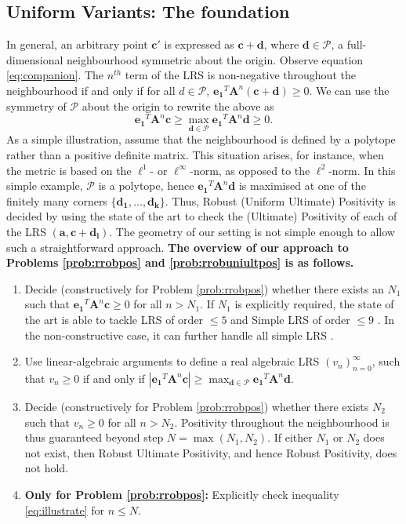 \subsection{Uniform Variants: The foundation}
\label{section:uniformfoundation}
In general, an arbitrary point $\mathbf{c'}$ is expressed as $\mathbf{c} + \mathbf{d}$, where $\mathbf{d} \in \mathcal{P}$, a full-dimensional neighbourhood symmetric about the origin. Observe equation \ref{eq:companion}. The $n^{th}$ term of the LRS is non-negative throughout the neighbourhood if and only if for all $d \in \mathcal{P}$,
$
\mathbf{e_1}^T \mathbf{A}^n (\mathbf{c + d}) \ge 0.
$
We can use the symmetry of $\mathcal{P}$ about the origin to rewrite the above as
\begin{equation}
\label{eq:illustrate}
\mathbf{e_1}^T \mathbf{A}^n \mathbf{c}\ge \max_{\mathbf{d} \in \mathcal{P}} \mathbf{e_1}^T\mathbf{A}^n\mathbf{d} \ge 0.
\end{equation}
As a simple illustration, assume that the neighbourhood is defined by a polytope rather than a positive definite matrix. This situation arises, for instance, when the metric is based on the $\ell^1$- or $\ell^\infty$-norm, as opposed to the $\ell^2$-norm.  In this simple example, $\mathcal{P}$ is a polytope, hence $\mathbf{e_1}^T\mathbf{A}^n\mathbf{d}$ is maximised at one of the finitely many corners $\{\mathbf{d_1}, \dots, \mathbf{d_k}\}$. Thus, Robust (Uniform Ultimate) Positivity is decided by using the state of the art \cite{joeljames3} to check the (Ultimate) Positivity of each of the LRS $(\mathbf{a}, \mathbf{c+d_i})$. The geometry of our setting is not simple enough to allow such a straightforward approach.
\textbf{The overview of our approach to Problems \ref{prob:rrobpos} and \ref{prob:rrobuniultpos} is as follows.}
\begin{enumerate}
\item Decide (constructively for Problem \ref{prob:rrobpos}) whether there exists an $N_1$ such that $\mathbf{e_1}^T \mathbf{A}^n \mathbf{c} \ge 0$ for all $n > N_1$. If $N_1$ is explicitly required, the state of the art is able to tackle LRS of order $\le 5$ \cite{joeljames3} and Simple LRS of order $\le 9$ \cite{ouaknine2014positivity}. In the non-constructive case, it can further handle all simple LRS \cite{ouaknine2014ultimate}.
\item Use linear-algebraic arguments to define a real algebraic LRS $(v_n)_{n=0}^\infty$, such that $v_n \ge 0$ if and only if $|\mathbf{e_1}^T \mathbf{A}^n \mathbf{c}|\ge \max_{\mathbf{d} \in \mathcal{P}} \mathbf{e_1}^T\mathbf{A}^n\mathbf{d}$.
\item Decide (constructively for Problem \ref{prob:rrobpos}) whether there exists $N_2$ such that $v_n \ge 0$ for all $n > N_2$. Positivity throughout the neighbourhood is thus guaranteed beyond step $N = \max(N_1, N_2)$. If either $N_1$ or $N_2$ does not exist, then Robust Ultimate Positivity, and hence Robust Positivity, does not hold.
\item \textbf{Only for Problem \ref{prob:rrobpos}:} Explicitly check inequality \ref{eq:illustrate} for $n \le N$.
\end{enumerate}

